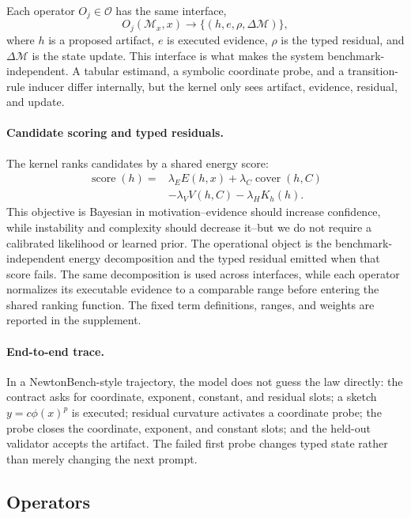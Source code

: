 \documentclass[letterpaper]{article}
\begin{document}
Each operator $O_j\in\mathcal{O}$ has the same interface,
\begin{equation}
  O_j(\mathcal{M}_x,x) \rightarrow
  \{(h,e,\rho,\Delta\mathcal{M})\},
\end{equation}
where $h$ is a proposed artifact, $e$ is executed evidence, $\rho$ is the typed
residual, and $\Delta\mathcal{M}$ is the state update. This interface is what
makes the system benchmark-independent. A tabular estimand, a symbolic
coordinate probe, and a transition-rule inducer differ internally, but the
kernel only sees artifact, evidence, residual, and update.

\paragraph{Candidate scoring and typed residuals.}
The kernel ranks candidates by a shared energy score:
\begin{equation}
\begin{aligned}
  \operatorname{score}(h)
  ={}& \lambda_E E(h,x)
  + \lambda_C \operatorname{cover}(h,C) \\
  &- \lambda_V V(h,C)
  - \lambda_H K_h(h).
\end{aligned}
\end{equation}
This objective is Bayesian in motivation--evidence should increase confidence,
while instability and complexity should decrease it--but we do not require a
calibrated likelihood or learned prior. The operational object is the
benchmark-independent energy decomposition and the typed residual emitted when
that score fails. The same decomposition is used across interfaces,
while each operator normalizes its executable evidence to a comparable range
before entering the shared ranking function. The fixed term definitions,
ranges, and weights are reported in the supplement.

\paragraph{End-to-end trace.}
In a NewtonBench-style trajectory, the model does not guess the law directly:
the contract asks for coordinate, exponent, constant, and residual slots; a
sketch $y=c\phi(x)^p$ is executed; residual curvature activates a coordinate
probe; the probe closes the coordinate, exponent, and constant slots; and the
held-out validator accepts the artifact. The
failed first probe changes typed state rather than merely changing the next
prompt.

\subsection{Operators}
\end{document}
